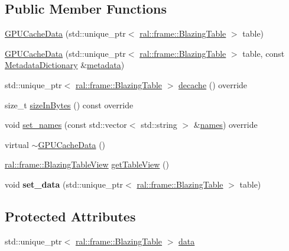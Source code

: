 \subsection*{Public Member Functions}
\begin{DoxyCompactItemize}
\item 
\hyperlink{classral_1_1cache_1_1GPUCacheData_aecac4050bf35d52a069842bda9e01906}{G\+P\+U\+Cache\+Data} (std\+::unique\+\_\+ptr$<$ \hyperlink{classral_1_1frame_1_1BlazingTable}{ral\+::frame\+::\+Blazing\+Table} $>$ table)
\item 
\hyperlink{classral_1_1cache_1_1GPUCacheData_a0844305a3dca5ec2582254b3ba83f7d7}{G\+P\+U\+Cache\+Data} (std\+::unique\+\_\+ptr$<$ \hyperlink{classral_1_1frame_1_1BlazingTable}{ral\+::frame\+::\+Blazing\+Table} $>$ table, const \hyperlink{classral_1_1cache_1_1MetadataDictionary}{Metadata\+Dictionary} \&\hyperlink{classral_1_1cache_1_1CacheData_aaeb232ef3aa8c2a3d86e1169ed2e8152}{metadata})
\item 
std\+::unique\+\_\+ptr$<$ \hyperlink{classral_1_1frame_1_1BlazingTable}{ral\+::frame\+::\+Blazing\+Table} $>$ \hyperlink{classral_1_1cache_1_1GPUCacheData_a7efe1d821067ba5266df18adb701bf5f}{decache} () override
\item 
size\+\_\+t \hyperlink{classral_1_1cache_1_1GPUCacheData_a4fc8aecb334114f0ef07ce37be0e8900}{size\+In\+Bytes} () const override
\item 
void \hyperlink{classral_1_1cache_1_1GPUCacheData_a35d56396384cd4380141d47291d3e55f}{set\+\_\+names} (const std\+::vector$<$ std\+::string $>$ \&\hyperlink{classral_1_1cache_1_1CacheData_aa2c8d58823d781cc1f8e6e589d897642}{names}) override
\item 
virtual \hyperlink{classral_1_1cache_1_1GPUCacheData_ad592cf9835ac4b7f0056a8a1e7f0fe10}{$\sim$\+G\+P\+U\+Cache\+Data} ()
\item 
\hyperlink{classral_1_1frame_1_1BlazingTableView}{ral\+::frame\+::\+Blazing\+Table\+View} \hyperlink{classral_1_1cache_1_1GPUCacheData_af2765b19b50907081b1e73c07a2155eb}{get\+Table\+View} ()
\item 
\mbox{\label{classral_1_1cache_1_1GPUCacheData_acfb3dca58fcf14708e1b57f84d8b0f50}} 
void {\bfseries set\+\_\+data} (std\+::unique\+\_\+ptr$<$ \hyperlink{classral_1_1frame_1_1BlazingTable}{ral\+::frame\+::\+Blazing\+Table} $>$ table)
\end{DoxyCompactItemize}
\subsection*{Protected Attributes}
\begin{DoxyCompactItemize}
\item 
std\+::unique\+\_\+ptr$<$ \hyperlink{classral_1_1frame_1_1BlazingTable}{ral\+::frame\+::\+Blazing\+Table} $>$ \hyperlink{classral_1_1cache_1_1GPUCacheData_a2a960bdb89bb40964a9c317f1b06fd8c}{data}
\end{DoxyCompactItemize}
